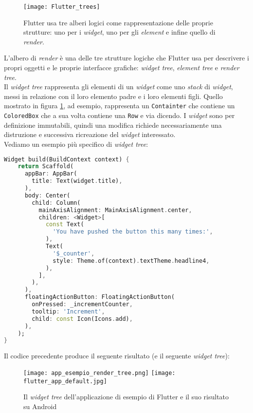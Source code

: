\begin{appendices}
\begin{figure}[H]
    \centering
    \texttt{[image: Flutter\_trees]}
    \caption[I tre alberi di Flutter]{Flutter usa tre alberi logici come rappresentazione delle proprie strutture: uno per i \textit{widget}, uno per gli \textit{element} e infine quello di \textit{render}.\footnotemark}
    \label{fig:flutter-trees}
\end{figure}

L'albero di \textit{render} è una delle tre strutture logiche che Flutter usa per descrivere i propri oggetti e le proprie interfacce grafiche: \textit{widget tree}, \textit{element tree} e \textit{render tree}. \\
Il \textit{widget tree} rappresenta gli elementi di un \textit{widget} come uno \textit{stack} di \textit{widget}, messi in relazione con il loro elemento padre e i loro elementi figli. Quello mostrato in figura \ref{fig:flutter-trees}, ad esempio, rappresenta un \verb+Containter+ che contiene un \verb+ColoredBox+ che a sua volta contiene una \verb+Row+ e via dicendo. I \textit{widget} sono per definizione immutabili, quindi una modifica richiede necessariamente una distruzione e successiva ricreazione del \textit{widget} interessato.\\
Vediamo un esempio più specifico di \textit{widget tree}:

\begin{lstlisting}[language=dart, caption={Codice rilevante per la parte grafica dell'\textit{app} di esempio di Flutter}]
Widget build(BuildContext context) {
    return Scaffold(
      appBar: AppBar(
        title: Text(widget.title),
      ),
      body: Center(
        child: Column(
          mainAxisAlignment: MainAxisAlignment.center,
          children: <Widget>[
            const Text(
              'You have pushed the button this many times:',
            ),
            Text(
              '$_counter',
              style: Theme.of(context).textTheme.headline4,
            ),
          ],
        ),
      ),
      floatingActionButton: FloatingActionButton(
        onPressed: _incrementCounter,
        tooltip: 'Increment',
        child: const Icon(Icons.add),
      ), 
    );
}
\end{lstlisting}

Il codice precedente produce il seguente risultato (e il seguente \textit{widget tree}):

\begin{figure}[H]
    \centering
    \texttt{[image: app\_esempio\_render\_tree.png]}\hspace{15mm}
    \texttt{[image: flutter\_app\_default.jpg]}
    \caption[\textit{Widget tree} app esempio]{Il \textit{widget tree} dell'applicazione di esempio di Flutter e il suo risultato su Android}
\end{figure}


\end{appendices}
